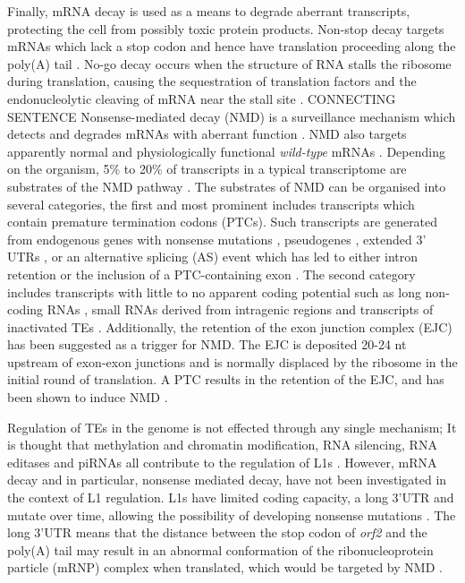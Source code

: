 \documentclass[12pt]{article}
\begin{document}
			Finally, mRNA decay is used as a means to degrade aberrant transcripts, protecting the cell from possibly toxic protein products.
			Non-stop decay targets mRNAs which lack a stop codon and hence have translation proceeding along the poly(A) tail \citep{Hoof02}.
			No-go decay occurs when the structure of RNA stalls the ribosome during translation, causing the sequestration of translation factors and the endonucleolytic cleaving of mRNA near the stall site \citep{Doma06}. 
			{\huge CONNECTING SENTENCE}		
			Nonsense-mediated decay (NMD) is a surveillance mechanism which detects and degrades mRNAs with aberrant function \citep{ Kervestin12, Lykke-Andersen14}.
			NMD also targets apparently normal and physiologically functional \textit{wild-type} mRNAs \citep{Schweingruber13}.
			Depending on the organism, 5\% to 20\% of transcripts in a typical transcriptome are substrates of the NMD pathway \citep{He15}.
			The substrates of NMD can be organised into several categories, the first and most prominent includes transcripts which contain premature termination codons (PTCs).
			Such transcripts are generated from endogenous genes with nonsense mutations \citep{Conti05}, pseudogenes \citep{Mcglincy08}, extended 3' UTRs \citep{Garneau07}, or an alternative splicing (AS) event which has led to either intron retention or the inclusion of a PTC-containing exon \citep{Ge14,Ni07}.
			The second category includes transcripts with little to no apparent coding potential such as long non-coding RNAs \citep{Lykke-Andersenb14}, small RNAs derived from intragenic regions \citep{Smith14} and transcripts of inactivated TEs \citep{He03}.
			Additionally, the retention of the exon junction complex (EJC) has been suggested as a trigger for NMD. %
			The EJC is deposited 20-24 nt upstream of exon-exon junctions \citep{Le-Hir00} and is normally displaced by the ribosome in the initial round of translation.
			A PTC results in the retention of the EJC, and has been shown to induce NMD \citep{Gehring05, Lykke-Andersen01}. 
			
			Regulation of TEs in the genome is not effected through any single mechanism; It is thought that methylation and chromatin modification, RNA silencing, RNA editases and piRNAs all contribute to the regulation of L1s \citep{Bodak14}.
			However, mRNA decay and in particular, nonsense mediated decay, have not been investigated in the context of L1 regulation.
			L1s have limited coding capacity, a long 3'UTR and mutate over time, allowing the possibility of developing nonsense mutations \citep{Penzkofer05, Goodier13}.
			The long 3'UTR means that the distance between the stop codon of \textit{orf2} and the poly(A) tail may result in an abnormal conformation of the ribonucleoprotein particle (mRNP) complex when translated, which would be targeted by NMD \citep{Garneau07}.
\end{document}
